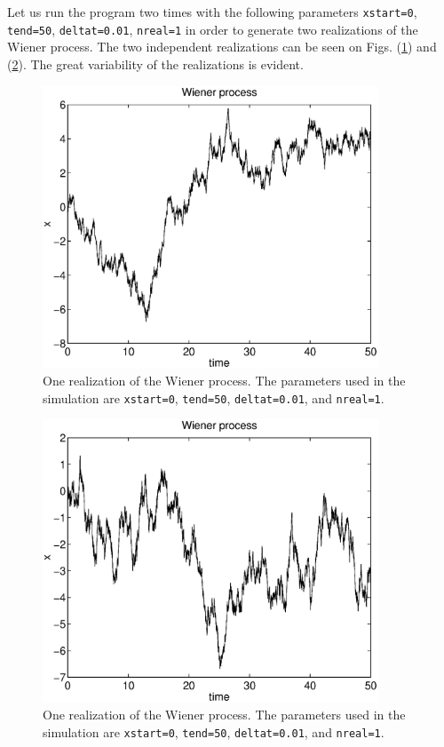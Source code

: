 Let us run the program two times with the following parameters
\texttt{xstart=0}, \texttt{tend=50}, \texttt{deltat=0.01}, 
\texttt{nreal=1} in order to generate two realizations of the 
Wiener process. The two independent realizations can be seen 
on Figs. (\ref{F_WIENER_R1}) and (\ref{F_WIENER_R2}). The great 
variability of the realizations is evident. 
\begin{figure}
\label{F_WIENER_R1}
\includegraphics[width=10cm]{./Figures/f_wiener_r1.eps}
\caption{One realization of the Wiener process.
The parameters used in the simulation are \texttt{xstart=0},
\texttt{tend=50}, \texttt{deltat=0.01}, and \texttt{nreal=1}.}
\end{figure}
\begin{figure}
\label{F_WIENER_R2}
\includegraphics[width=10cm]{./Figures/f_wiener_r2.eps}
\caption{One realization of the Wiener process.
The parameters used in the simulation are \texttt{xstart=0},
\texttt{tend=50}, \texttt{deltat=0.01}, and \texttt{nreal=1}.}
\end{figure}
